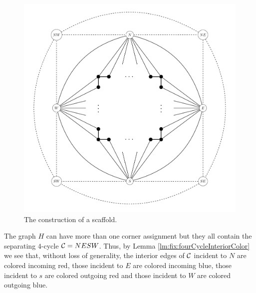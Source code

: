   \begin{figure}[h!]
  \centering
  \includegraphics[scale=0.5]{fixExtension/img/scafold}

  \caption{The construction of a scaffold.
      \label{fig:scafold}}
  \end{figure}


  The graph $H$ can have more than one corner assignment but they all contain the separating $4$-cycle $\mathcal{C}= NESW$. Thus, by Lemma \ref{lm:fix:fourCycleInteriorColor} we see that, without loss of generality, the interior edges of $\mathcal{C}$ incident to $N$ are colored incoming red, those incident to $E$ are colored incoming blue, those incident to $s$ are colored outgoing red and those incident to $W$ are colored outgoing blue.

